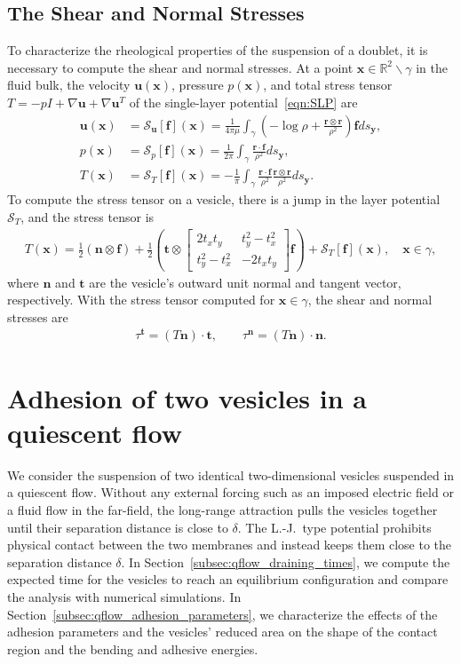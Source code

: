 \documentclass[prf,superscriptaddress,showpacs]{revtex4-1}
\newcommand{\ff}{\mathbf{f}}
\newcommand{\nn}{\mathbf{n}}
\renewcommand{\tt}{\mathbf{t}}
\newcommand{\rr}{\mathbf{r}}
\newcommand{\RR}{\mathbb{R}}
\renewcommand{\SS}{\mathcal{S}}
\newcommand{\uu}{\mathbf{u}}
\newcommand{\xx}{\mathbf{x}}
\newcommand{\yy}{\mathbf{y}}
\begin{document}
\subsection{The Shear and Normal Stresses}
To characterize the rheological properties of the suspension of a
doublet, it is necessary to compute the shear and normal stresses.  At a
point $\xx \in \RR^2 \backslash \gamma$ in the fluid bulk, the velocity
$\uu(\xx)$, pressure $p(\xx)$, and total stress tensor $T = - p I +
\nabla \uu + \nabla \uu^T$ of the single-layer potential~\eqref{eqn:SLP}
are
\begin{align*}
  \uu(\xx) &= \SS_\uu[\ff](\xx) = \frac{1}{4\pi\mu}\int_{\gamma} \left( 
    -\log \rho + \frac{\rr \otimes \rr}{\rho^2} \right) 
    \ff ds_\yy, \\
    p(\xx) &= \SS_p[\ff](\xx) = \frac{1}{2\pi} \int_{\gamma} 
    \frac{\rr \cdot \ff}{\rho^2} ds_\yy, \\
    T(\xx) &= \SS_T[\ff](\xx) = -\frac{1}{\pi}\int_{\gamma}
      \frac{\rr \cdot \ff}{\rho^2} 
      \frac{\rr \otimes \rr}{\rho^2} ds_\yy.
\end{align*}
To compute the stress tensor on a vesicle, there is a jump in the layer
potential $\SS_T$, and the stress tensor is
\begin{align*}
  T(\xx) = \frac{1}{2}(\nn \otimes \ff) + \frac{1}{2} \left(
    \tt \otimes \left[
    \begin{array}{cc}
      2 t_x t_y & t_y^2 - t_x^2 \\
      t_y^2 - t_x^2 & -2 t_x t_y
    \end{array}
    \right] \ff \right) + 
  \SS_T[\ff](\xx), \quad \xx \in \gamma,
\end{align*}
where $\nn$ and $\tt$ are the vesicle's outward unit normal and tangent
vector, respectively.  With the stress tensor computed for $\xx \in
\gamma$, the shear and normal stresses are
\begin{align*}
  \tau^\tt = (T \nn) \cdot \tt, \qquad
  \tau^\nn = (T \nn) \cdot \nn.
\end{align*}


\section{Adhesion of two vesicles in a quiescent flow} 
\label{sec:qflow} 
We consider the suspension of two identical two-dimensional vesicles
suspended in a quiescent flow.  Without any external forcing such as an
imposed electric field or a fluid flow in the far-field, the long-range
attraction pulls the vesicles together until their separation distance
is close to $\delta$. The L.-J.~type potential prohibits physical
contact between the two membranes and instead keeps them close to the
separation distance $\delta$.  In
Section~\ref{subsec:qflow_draining_times}, we compute the expected time
for the vesicles to reach an equilibrium configuration and compare the
analysis with numerical simulations.  In
Section~\ref{subsec:qflow_adhesion_parameters}, we characterize the
effects of the adhesion parameters and the vesicles' reduced area on the
shape of the contact region and the bending and adhesive energies.
\end{document}
